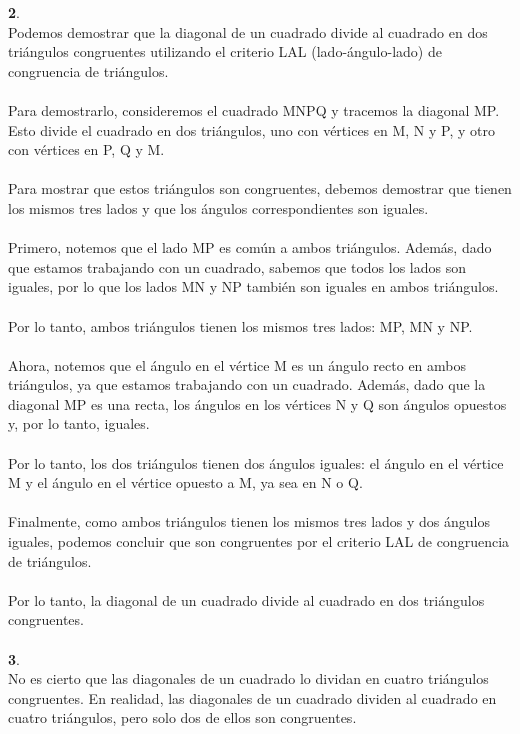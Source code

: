 \documentclass{article}
\begin{document}
{\textbf 2. }\\
Podemos demostrar que la diagonal de un cuadrado divide al cuadrado en dos triángulos congruentes utilizando el criterio LAL (lado-ángulo-lado) de congruencia de triángulos.\\
\\
Para demostrarlo, consideremos el cuadrado MNPQ y tracemos la diagonal MP. Esto divide el cuadrado en dos triángulos, uno con vértices en M, N y P, y otro con vértices en P, Q y M.\\
\\
Para mostrar que estos triángulos son congruentes, debemos demostrar que tienen los mismos tres lados y que los ángulos correspondientes son iguales.\\
\\
Primero, notemos que el lado MP es común a ambos triángulos. Además, dado que estamos trabajando con un cuadrado, sabemos que todos los lados son iguales, por lo que los lados MN y NP también son iguales en ambos triángulos.\\
\\
Por lo tanto, ambos triángulos tienen los mismos tres lados: MP, MN y NP.\\
\\
Ahora, notemos que el ángulo en el vértice M es un ángulo recto en ambos triángulos, ya que estamos trabajando con un cuadrado. Además, dado que la diagonal MP es una recta, los ángulos en los vértices N y Q son ángulos opuestos y, por lo tanto, iguales.\\
\\
Por lo tanto, los dos triángulos tienen dos ángulos iguales: el ángulo en el vértice M y el ángulo en el vértice opuesto a M, ya sea en N o Q.\\
\\
Finalmente, como ambos triángulos tienen los mismos tres lados y dos ángulos iguales, podemos concluir que son congruentes por el criterio LAL de congruencia de triángulos.\\
\\
Por lo tanto, la diagonal de un cuadrado divide al cuadrado en dos triángulos congruentes.\\
\\
{\textbf 3. }\\
No es cierto que las diagonales de un cuadrado lo dividan en cuatro triángulos congruentes. En realidad, las diagonales de un cuadrado dividen al cuadrado en cuatro triángulos, pero solo dos de ellos son congruentes.\\
\end{document}
